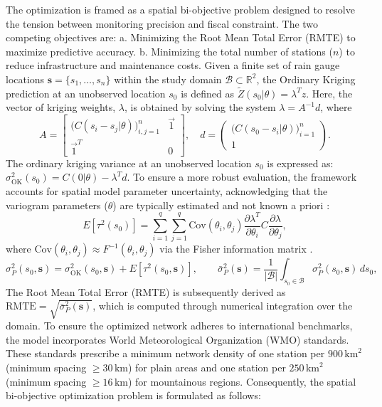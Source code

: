 \documentclass[twoside]{article}
\begin{document}
The optimization is framed as a spatial bi-objective problem designed to resolve the tension between monitoring precision and fiscal constraint. The two competing objectives are: a. Minimizing the Root Mean Total Error (RMTE) to maximize predictive accuracy.  b. Minimizing the total number of stations ($n$) to reduce infrastructure and maintenance costs. Given a finite set of rain gauge locations $\mathbf{s} = \{s_1, \ldots, s_n\}$ within the study domain $\mathcal{B} \subset \mathbb{R}^2$, the Ordinary Kriging prediction at an unobserved location $s_0$ is defined as $\tilde{Z}(s_0|\theta) = \lambda^T z$. Here, the vector of kriging weights, $\lambda$, is obtained by solving the system $\lambda = A^{-1}d$, where
\begin{equation}\label{eq:kriging}
A = \begin{bmatrix} \bigl(C(s_i - s_j|\theta)\bigr)_{i,j=1}^n & \vec{1} \\ \vec{1}^T & 0 \end{bmatrix}, \quad
d = \begin{pmatrix} \bigl(C(s_0 - s_i|\theta)\bigr)_{i=1}^n \\ 1 \end{pmatrix}.
\end{equation}
The ordinary kriging variance at an unobserved location $s_0$ is expressed as: $\sigma^2_{\text{OK}}(s_0) = C(0|\theta) - \lambda^T d$.
To ensure a more robust evaluation, the framework accounts for spatial model parameter uncertainty, acknowledging that the variogram parameters ($\theta$) are typically estimated and not known a priori  %
\citep{Wadoux:2019}:
\begin{equation}\label{eq:paramunc}
E[\tau^2(s_0)] = \sum_{i=1}^{q}\sum_{j=1}^{q} \text{Cov}(\theta_i,\theta_j) \frac{\partial \lambda^T}{\partial \theta_i} C \frac{\partial \lambda}{\partial \theta_j},
\end{equation}
where $\text{Cov}(\theta_i,\theta_j) \approx F^{-1}(\theta_i,\theta_j)$ via the Fisher information matrix . %
\begin{equation}\label{eq:totalerror}
\sigma^2_P(s_0, \mathbf{s}) = \sigma^2_{\text{OK}}(s_0, \mathbf{s}) + E[\tau^2(s_0, \mathbf{s})], \qquad
\bar{\sigma}^2_P(\mathbf{s}) = \frac{1}{|\mathcal{B}|} \int_{s_0 \in \mathcal{B}} \sigma^2_P(s_0, \mathbf{s})\, ds_0,
\end{equation}
The Root Mean Total Error (RMTE) is subsequently derived as $\text{RMTE} = \sqrt{\bar{\sigma}^2_P(\mathbf{s})}$, which is computed through numerical integration over the domain. To ensure the optimized network adheres to international benchmarks, the model incorporates World Meteorological Organization (WMO) standards. These standards prescribe a minimum network density of one station per $900\,\text{km}^2$ (minimum spacing $\geq 30\,\text{km}$) for plain areas and one station per $250\,\text{km}^2$ (minimum spacing $\geq 16\,\text{km}$) for mountainous regions. Consequently, the spatial bi-objective optimization problem is formulated as follows:
\end{document}
